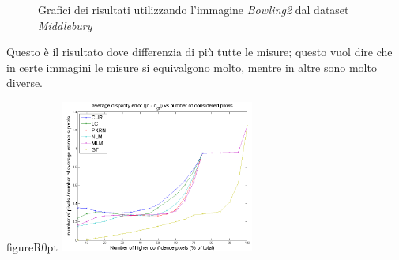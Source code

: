 \documentclass[12pt]{report}
\begin{document}
			\begin{figure}[<h>]
				\centering
				 \quad
			
				\caption{Grafici dei risultati utilizzando l'immagine \textit{Bowling2} dal dataset \textit{Middlebury}}
				\label{fig:risultati}
			\end{figure}	
			
			\noindent Questo è il risultato dove differenzia di più tutte le misure; questo vuol dire che in certe immagini le misure si equivalgono molto, mentre in altre sono molto diverse. 
			
			\begin{wrapfloat}{figure}{R}{0pt}
				\includegraphics[width=0.48\textwidth]{./figures/result3.png}
				\caption{Errore di disparità medio nella figura \textit{Aloe}.}
				\label{fig:risultati2}
			\end{wrapfloat}
			
\end{document}
